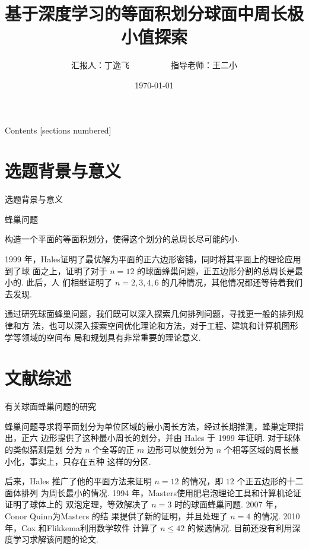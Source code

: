 \documentclass[12pt,aspectratio=169]{beamer}
\title{基于深度学习的等面积划分球面中周长极小值探索}
\date{\today}
\author{汇报人：丁逸飞\ \ \ \ \ \ \ \ \ \ 指导老师：王二小}
\begin{document}
\maketitle
\footnotesize
\begin{frame}{Contents}
  [sections numbered]
  \tableofcontents%
\end{frame}

\section{选题背景与意义}

\begin{frame}{选题背景与意义}

  \begin{block}{蜂巢问题}

    构造一个平面的等面积划分，使得这个划分的总周长尽可能的小. 

  \end{block}

  1999 年，Hales\cite{hales2001honeycomb}证明了最优解为平面的正六边形密铺，同时将其平面上的理论应用到了球
  面之上，证明了对于 $n = 12$ 的球面蜂巢问题，正五边形分割的总周长是最小的. 此后，人
  们相继证明了 $n = 2, 3, 4, 6$ 的几种情况，其他情况都还等待着我们去发现. 

  通过研究球面蜂巢问题，我们既可以深入探索几何排列问题，寻找更一般的排列规律和方
  法，也可以深入探索空间优化理论和方法，对于工程、建筑和计算机图形学等领域的空间布
  局和规划具有非常重要的理论意义. 

\end{frame}

\section{文献综述}

\begin{frame}{有关球面蜂巢问题的研究}

  蜂巢问题寻求将平面划分为单位区域的最小周长方法，经过长期推测，蜂巢定理指出，正六
  边形提供了这种最小周长的划分，并由 Hales 于 1999 年证明\cite{hales2001honeycomb}. 对于球体的类似猜测是划
  分为 $n$ 个全等的正 $m$ 边形可以使划分为 $n$ 个相等区域的周长最小化，事实上，只存在五种
  这样的分区. 

  后来，Hales 推广了他的平面方法来证明 $n = 12$ 的情况，即 $12$ 个正五边形的十二面体排列
  为周长最小的情况. 1994 年，Masters\cite{masters1996perimeter}使用肥皂泡理论工具和计算机论证证明了球体上的
  双泡定理，等效解决了 $n = 3$ 时的球面蜂巢问题. 2007 年，Conor Quinn\cite{quinn2007least}为Masters 的结
  果提供了新的证明，并且处理了 $n = 4$ 的情况. 2010 年，Cox 和Flikkema\cite{cox2010minimal}利用数学软件
  计算了 $n \leq 42$ 的候选情况. 目前还没有利用深度学习求解该问题的论文. 

\end{frame}
\end{document}
